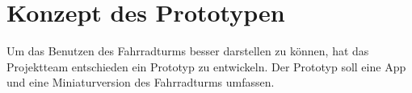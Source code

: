 \section{Konzept des Prototypen}

Um das Benutzen des Fahrradturms besser darstellen zu können, hat das Projektteam entschieden ein Prototyp zu entwickeln. Der Prototyp soll eine App und eine Miniaturversion des Fahrradturms umfassen.





